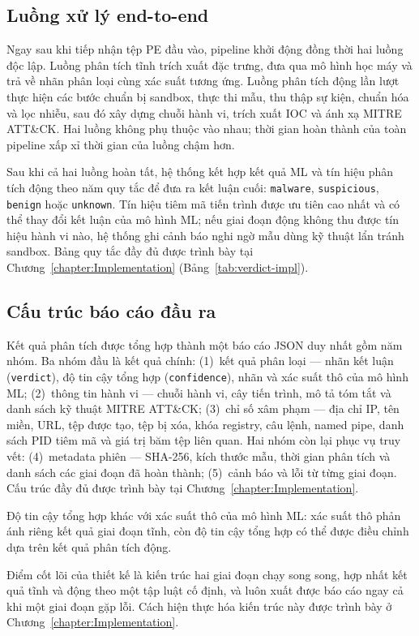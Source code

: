 \documentclass[../DoAn.tex]{subfiles}
\begin{document}
\subsection{Luồng xử lý end-to-end}
\label{section:3.5.1}
Ngay sau khi tiếp nhận tệp PE đầu vào, pipeline khởi động đồng
thời hai luồng độc lập. Luồng phân tích tĩnh trích xuất đặc trưng,
đưa qua mô hình học máy và trả về nhãn phân loại cùng xác suất
tương ứng. Luồng phân tích động lần lượt thực hiện các bước chuẩn
bị sandbox, thực thi mẫu, thu thập sự kiện, chuẩn hóa và lọc
nhiễu, sau đó xây dựng chuỗi hành vi, trích xuất IOC và ánh xạ
MITRE ATT\&CK. Hai luồng không phụ thuộc vào nhau; thời gian hoàn
thành của toàn pipeline xấp xỉ thời gian của luồng chậm hơn.

Sau khi cả hai luồng hoàn tất, hệ thống kết hợp kết quả ML và tín
hiệu phân tích động theo năm quy tắc để đưa ra kết luận cuối:
\texttt{malware}, \texttt{suspicious}, \texttt{benign} hoặc
\texttt{unknown}. Tín hiệu tiêm mã tiến trình được ưu tiên cao nhất
và có thể thay đổi kết luận của mô hình ML; nếu giai đoạn động không
thu được tín hiệu hành vi nào, hệ thống ghi cảnh báo nghi ngờ mẫu
dùng kỹ thuật lẩn tránh sandbox. Bảng quy tắc đầy đủ được trình bày
tại Chương~\ref{chapter:Implementation} (Bảng~\ref{tab:verdict-impl}).

\subsection{Cấu trúc báo cáo đầu ra}
\label{section:3.5.2}

Kết quả phân tích được tổng hợp thành một báo cáo JSON duy nhất gồm
năm nhóm. Ba nhóm đầu là kết quả chính: (1)~kết quả phân loại — nhãn
kết luận (\texttt{verdict}),
độ tin cậy tổng hợp (\texttt{confidence}), nhãn và xác suất thô của
mô hình ML; (2)~thông tin hành vi — chuỗi hành vi, cây tiến trình,
mô tả tóm tắt và danh sách kỹ thuật MITRE ATT\&CK; (3)~chỉ số xâm
phạm — địa chỉ IP, tên miền, URL, tệp được tạo, tệp bị xóa, khóa
registry, câu lệnh, named pipe, danh sách PID tiêm mã và giá trị băm
tệp liên quan. Hai nhóm còn lại phục vụ truy vết:
(4)~metadata phiên — SHA-256, kích thước mẫu, thời gian phân
tích và danh sách các giai đoạn đã hoàn thành; (5)~cảnh báo và lỗi
từ từng giai đoạn. Cấu trúc đầy đủ được trình bày tại
Chương~\ref{chapter:Implementation}.

Độ tin cậy tổng hợp khác với xác suất thô của mô hình ML: xác suất
thô phản ánh riêng kết quả giai đoạn tĩnh, còn độ tin cậy tổng hợp
có thể được điều chỉnh dựa trên kết quả phân tích động.

Điểm cốt lõi của thiết kế là kiến trúc hai giai đoạn chạy song song,
hợp nhất kết quả tĩnh và động theo một tập luật cố định, và luôn xuất
được báo cáo ngay cả khi một giai đoạn gặp lỗi. Cách hiện thực hóa
kiến trúc này được trình bày ở Chương~\ref{chapter:Implementation}.
\end{document}
